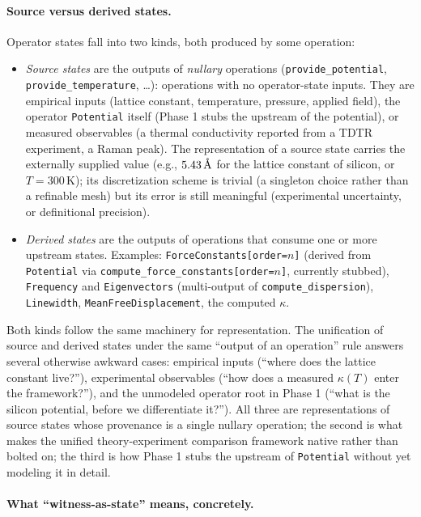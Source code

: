 \documentclass[11pt,a4paper]{article}
\begin{document}
\paragraph{Source versus derived states.} Operator states fall into two kinds, both
produced by some operation:
\begin{itemize}[leftmargin=2em]
  \item \emph{Source states} are the outputs of \emph{nullary} operations
        (\texttt{provide\_potential}, \texttt{provide\_temperature}, \ldots): operations
        with no operator-state inputs. They are empirical inputs (lattice constant,
        temperature, pressure, applied field), the operator \texttt{Potential} itself
        (Phase 1 stubs the upstream of the potential), or measured observables (a
        thermal conductivity reported from a TDTR experiment, a Raman peak). The
        representation of a source state carries the externally supplied value (e.g.,
        $5.43\,\textup{\AA}$ for the lattice constant of silicon, or $T = 300\,\text{K}$);
        its discretization scheme is trivial (a singleton choice rather than a refinable
        mesh) but its error is still meaningful (experimental uncertainty, or
        definitional precision).
  \item \emph{Derived states} are the outputs of operations that consume one or more
        upstream states. Examples: \texttt{ForceConstants[order=$n$]} (derived from
        \texttt{Potential} via \texttt{compute\_force\_constants[order=$n$]}, currently
        stubbed), \texttt{Frequency} and \texttt{Eigenvectors} (multi-output of
        \texttt{compute\_dispersion}), \texttt{Linewidth},
        \texttt{MeanFreeDisplacement}, the computed $\kappa$.
\end{itemize}
Both kinds follow the same machinery for representation. The unification of source and
derived states under the same ``output of an operation'' rule answers several otherwise
awkward cases: empirical inputs (``where does the lattice constant live?''), experimental
observables (``how does a measured $\kappa(T)$ enter the framework?''), and the unmodeled
operator root in Phase 1 (``what is the silicon potential, before we differentiate
it?''). All three are representations of source states whose provenance is a single
nullary operation; the second is what makes the unified theory-experiment comparison
framework native rather than bolted on; the third is how Phase 1 stubs the upstream of
\texttt{Potential} without yet modeling it in detail.


\paragraph{What ``witness-as-state'' means, concretely.}
\end{document}
